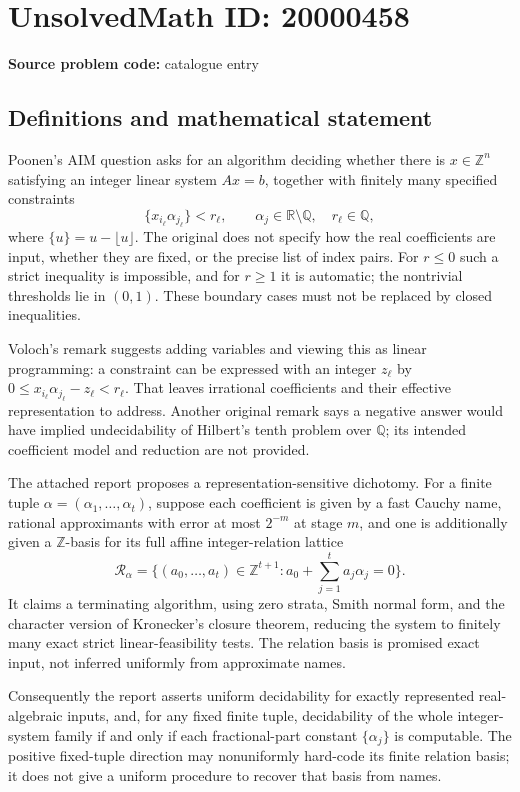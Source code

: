 \documentclass[11pt]{article}
\newcommand{\Z}{\mathbb{Z}}
\newcommand{\Q}{\mathbb{Q}}
\newcommand{\R}{\mathbb{R}}
\begin{document}
\section*{UnsolvedMath ID: 20000458}
\textbf{Source problem code:} catalogue entry
\subsection{Definitions and mathematical statement}
Poonen's AIM question asks for an algorithm deciding whether there is \(x\in\Z^n\) satisfying an integer linear system \(Ax=b\), together with finitely many specified constraints
\[
\{x_{i_\ell}\alpha_{j_\ell}\}<r_\ell,
\qquad \alpha_j\in\R\setminus\Q,\quad r_\ell\in\Q,
\]
where \(\{u\}=u-\lfloor u\rfloor\). The original does not specify how the real coefficients are input, whether they are fixed, or the precise list of index pairs. For \(r\leq0\) such a strict inequality is impossible, and for \(r\geq1\) it is automatic; the nontrivial thresholds lie in \((0,1)\). These boundary cases must not be replaced by closed inequalities.

Voloch's remark suggests adding variables and viewing this as linear programming: a constraint can be expressed with an integer \(z_\ell\) by \(0\leq x_{i_\ell}\alpha_{j_\ell}-z_\ell<r_\ell\). That leaves irrational coefficients and their effective representation to address. Another original remark says a negative answer would have implied undecidability of Hilbert's tenth problem over \(\Q\); its intended coefficient model and reduction are not provided.

The attached report proposes a representation-sensitive dichotomy. For a finite tuple \(\alpha=(\alpha_1,\ldots,\alpha_t)\), suppose each coefficient is given by a fast Cauchy name, rational approximants with error at most \(2^{-m}\) at stage \(m\), and one is additionally given a \(\Z\)-basis for its full affine integer-relation lattice
\[
\mathcal R_\alpha=\{(a_0,\ldots,a_t)\in\Z^{t+1}:a_0+\sum_{j=1}^ta_j\alpha_j=0\}.
\]
It claims a terminating algorithm, using zero strata, Smith normal form, and the character version of Kronecker's closure theorem, reducing the system to finitely many exact strict linear-feasibility tests. The relation basis is promised exact input, not inferred uniformly from approximate names.

Consequently the report asserts uniform decidability for exactly represented real-algebraic inputs, and, for any fixed finite tuple, decidability of the whole integer-system family if and only if each fractional-part constant \(\{\alpha_j\}\) is computable. The positive fixed-tuple direction may nonuniformly hard-code its finite relation basis; it does not give a uniform procedure to recover that basis from names.
\end{document}
